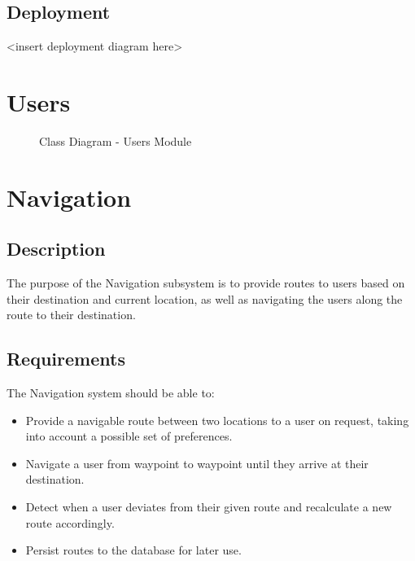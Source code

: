 \documentclass[english]{article}
\begin{document}
	   \subsection{Deployment}
	        \textless insert deployment diagram here\textgreater
	
	\section{Users}
	    \begin{figure}[H]
            \centering	            
            \centerline{}
            \caption{Class Diagram - Users Module}
        \end{figure}
	
	\section{Navigation}	
        \subsection{Description}
            The purpose of the Navigation subsystem is to provide routes to users based on their destination and current location, as well as navigating the users along the route to their destination.\\
       
       \subsection{Requirements}
            The Navigation system should be able to:
            \begin{itemize}
                \item Provide a navigable route between two locations to a user on request, taking into account a possible set of preferences.
                \item Navigate a user from waypoint to waypoint until they arrive at their destination.
                \item Detect when a user deviates from their given route and recalculate a new route accordingly.
                \item Persist routes to the database for later use.
            \end{itemize}
            
\end{document}
